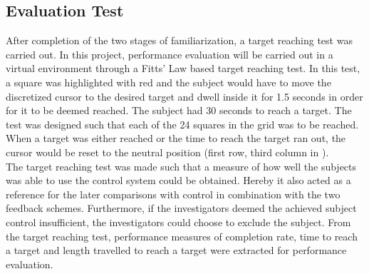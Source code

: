 \subsection{Evaluation Test} \label{sec:meth:contest}

After completion of the two stages of familiarization, a target reaching test was carried out. In this project, performance evaluation will be carried out in a virtual environment through a Fitts' Law based target reaching test. In this test, a square was highlighted with red and the subject would have to move the discretized cursor to the desired target and dwell inside it for 1.5 seconds in order for it to be deemed reached. The subject had 30 seconds to reach a target. The test was designed such that each of the 24 squares in the grid was to be reached. When a target was either reached or the time to reach the target ran out, the cursor would be reset to the neutral position (first row, third column in ). \\
The target reaching test was made such that a measure of how well the subjects was able to use the control system could be obtained. Hereby it also acted as a reference for the later comparisons with control in combination with the two feedback schemes. Furthermore, if the investigators deemed the achieved subject control insufficient, the investigators could choose to exclude the subject. From the target reaching test, performance measures of completion rate, time to reach a target and length travelled to reach a target were extracted for performance evaluation.

